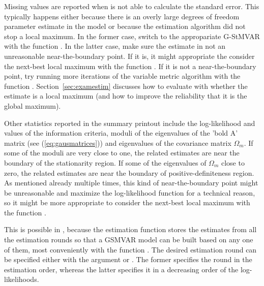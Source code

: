 \documentclass[nojss]{jss} %
\begin{document}
Missing values are reported when  is not able to calculate the standard error. This typically happens either because there is an overly large degrees of freedom parameter estimate in the model or because the estimation algorithm did not stop a local maximum. In the former case, switch to the appropariate G-StMVAR with the function . In the latter case, make sure the estimate in not an unreasonable near-the-boundary point. If it is, it might appropriate the consider the next-best local maximum with the function . If it is not a near-the-boundary point, try running more iterations of the variable metric algorithm with the function . Section~\ref{sec:examestim} discusses how to evaluate with  whether the estimate is a local maximum (and how to improve the reliability that it is the global maximum).

Other statistics reported in the summary printout include the log-likelihood and values of the information criteria, moduli of the eigenvalues of the 'bold A' matrix (see (\ref{eq:gausmatrices})) and eigenvalues of the covariance matrix $\Omega_m$. If some of the moduli are very close to one, the related estimates are near the boundary of the stationarity region. If some of the eigenvalues of $\Omega_m$ close to zero, the related estimates are near the boundary of positive-definiteness region. As mentioned already multiple times, this kind of near-the-boundary point might be unreasonable and maximize the log-likelihood function for a technical reason, so it might be more appropriate to consider the next-best local maximum with the function .

This is possible in , because the estimation function  stores the estimates from all the estimation rounds so that a GSMVAR model can be built based on any one of them, most conveniently with the function . The desired estimation round can be specified either with the argument  or . The former specifies the round in the estimation order, whereas the latter specifies it in a decreasing order of the log-likelihoods.
\end{document}
